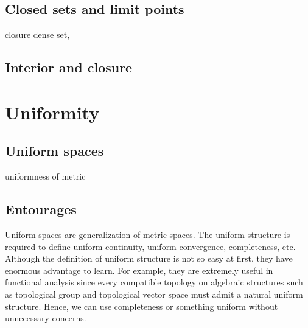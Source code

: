 \documentclass{../crs}
\begin{document}
\subsection{Closed sets and limit points}
 closure
 dense set,
\subsection{Interior and closure}




























\section{Uniformity}

\subsection{Uniform spaces}
uniformness of metric


\subsection{Entourages}


Uniform spaces are generalization of metric spaces.
The uniform structure is required to define uniform continuity, uniform convergence, completeness, etc.
Although the definition of uniform structure is not so easy at first, they have enormous advantage to learn.
For example, they are extremely useful in functional analysis since every compatible topology on algebraic structures such as topological group and topological vector space must admit a natural uniform structure.
Hence, we can use completeness or something uniform without unnecessary concerns.
\end{document}
